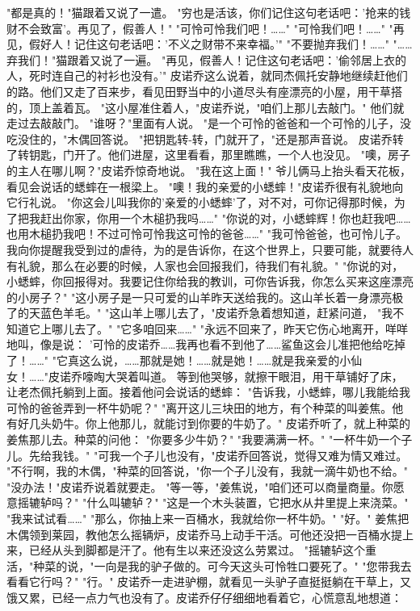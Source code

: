 \documentclass[12pt,UTF8]{ctexbook}
\begin{document}
"都是真的！"猫跟着又说了一遣。
"穷也是活该，你们记住这句老话吧：'抢来的钱财不会致富'。再见了，假善人！"
"可怜可怜我们吧！……"
"可怜我们吧！……"
"再见，假好人！记住这句老话吧：'不义之财带不来幸福。'"
"不要抛弃我们！……"
"……弃我们！"猫跟着又说了一遍。
"再见，假善人！记住这句老话吧：'偷邻居上衣的人，死时连自己的衬衫也没有。'"
皮诺乔这么说着，就同杰佩托安静地继续赶他们的路。他们又走了百来步，看见田野当中的小道尽头有座漂亮的小屋，用干草搭的，顶上盖着瓦。
"这小屋准住着人，"皮诺乔说，"咱们上那儿去敲门。"
他们就走过去敲敲门。
"谁呀？"里面有人说。
"是一个可怜的爸爸和一个可怜的儿子，没吃没住的，"木偶回答说。
"把钥匙转-转，门就开了，"还是那声音说。
皮诺乔转了转钥匙，门开了。他们进屋，这里看看，那里瞧瞧，一个人也没见。
"噢，房子的主人在哪儿啊？"皮诺乔惊奇地说。
"我在这上面！"
爷儿俩马上抬头看天花板，看见会说话的蟋蟀在一根梁上。
"噢！我的亲爱的小蟋蟀！"皮诺乔很有礼貌地向它行礼说。
"你这会儿叫我你的'亲爱的小蟋蟀'了，对不对，可你记得那时候，为了把我赶出你家，你用一个木槌扔我吗……"
"你说的对，小蟋蟀辉！你也赶我吧……也用木槌扔我吧！不过可怜可怜我这可怜的爸爸……"
"我可怜爸爸，也可怜儿子。我向你提醒我受到过的虐待，为的是告诉你，在这个世界上，只要可能，就要待人有礼貌，那么在必要的时候，人家也会回报我们，待我们有礼貌。"
"你说的对，小蟋蟀，你回报得对。我要记住你给我的教训，可你告诉我，你怎么买来这座漂亮的小房子？"
"这小房子是一只可爱的山羊昨天送给我的。这山羊长着一身漂亮极了的天蓝色羊毛。"
"这山羊上哪儿去了，"皮诺乔急着想知道，赶紧问道，
"我不知道它上哪儿去了。"
"它多咱回来……"
"永远不回来了，昨天它伤心地离开，咩咩地叫，像是说：
'可怜的皮诺乔……我再也看不到他了……鲨鱼这会儿准把他给吃掉了！……"
"它真这么说，……那就是她！……就是她！……就是我亲爱的小仙女！……"皮诺乔嚎啕大哭着叫道。
等到他哭够，就擦干眼泪，用干草铺好了床，让老杰佩托躺到上面。接着他问会说话的蟋蟀：
"告诉我，小蟋蟀，哪儿我能给我可怜的爸爸弄到一杯牛奶呢？"
"离开这儿三块田的地方，有个种菜的叫姜焦。他有好几头奶牛。你上他那儿，就能讨到你要的牛奶了。"
皮诺乔听了，就上种菜的姜焦那儿去。种菜的问他：
"你要多少牛奶？"
"我要满满一杯。"
"一杯牛奶一个子儿。先给我钱。"
"可我一个子儿也没有，"皮诺乔回答说，觉得又难为情又难过。
"不行啊，我的木偶，"种菜的回答说，"你一个子儿没有，我就一滴牛奶也不给。"
"没办法！"皮诺乔说着就要走。
"等一等，"姜焦说，"咱们还可以商量商量。你愿意摇辘轳吗？"
"什么叫辘轳？"
"这是一个木头装置，它把水从井里提上来浇菜。"
"我来试试看……"
"那么，你抽上来一百桶水，我就给你一杯牛奶。"
"好。"
姜焦把木偶领到莱园，教他怎么摇辆炉，皮诺乔马上动手干活。可他还没把一百桶水提上来，已经从头到脚都是汗了。他有生以来还没这么劳累过。
"摇辘轳这个重活，"种菜的说，"一向是我的驴子做的。可今天这头可怜牲口要死了。"
"您带我去看看它行吗？"
"行。"
皮诺乔一走进驴棚，就看见一头驴子直挺挺躺在干草上，又饿又累，已经一点力气也没有了。皮诺乔仔仔细细地看着它，心慌意乱地想道：
\end{document}
